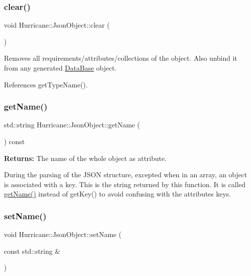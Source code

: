 \subsubsection{\texorpdfstring{clear()}{clear()}}
{\footnotesize\ttfamily void Hurricane\+::\+Json\+Object\+::clear (\begin{DoxyParamCaption}{ }\end{DoxyParamCaption})\hspace{0.3cm}{\ttfamily [inline]}}

Removes all requirements/attributes/collections of the object. Also unbind it from any generated \hyperlink{classHurricane_1_1DataBase}{Data\+Base} object. 

References get\+Type\+Name().

\mbox{\label{classHurricane_1_1JsonObject_aa4d6d0502f0f25e614ef50ac3dd76263}} 
\subsubsection{\texorpdfstring{get\+Name()}{getName()}}
{\footnotesize\ttfamily std\+::string Hurricane\+::\+Json\+Object\+::get\+Name (\begin{DoxyParamCaption}{ }\end{DoxyParamCaption}) const\hspace{0.3cm}{\ttfamily [inline]}}

{\bfseries Returns\+:} The name of the whole object as attribute.

During the parsing of the J\+S\+ON structure, excepted when in an array, an object is associated with a key. This is the string returned by this function. It is called {\ttfamily \hyperlink{classHurricane_1_1JsonObject_aa4d6d0502f0f25e614ef50ac3dd76263}{get\+Name()}} instead of {\ttfamily get\+Key()} to avoid confusing with the attributes keys. \mbox{\label{classHurricane_1_1JsonObject_aeda98a478720cf29e532e2a11f6f54c5}} 
\subsubsection{\texorpdfstring{set\+Name()}{setName()}}
{\footnotesize\ttfamily void Hurricane\+::\+Json\+Object\+::set\+Name (\begin{DoxyParamCaption}\item[{const std\+::string \&}]{ }\end{DoxyParamCaption})\hspace{0.3cm}{\ttfamily [inline]}}


